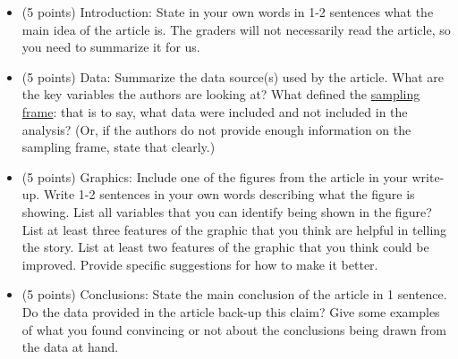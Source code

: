 \documentclass{article}\usepackage[]{graphicx}\usepackage[]{color}
\begin{document}
\begin{itemize}
    \item (5 points) Introduction: State in your own words in 1-2 sentences what the main idea of the article is. The graders will not necessarily read the article, so you need to summarize it for us.
    \item (5 points) Data: Summarize the data source(s) used by the article. What are the key variables the authors are looking at? What defined the \href{https://en.wikipedia.org/wiki/Sampling_frame}{sampling frame}: that is to say, what data were included and not included in the analysis? (Or, if the authors do not provide enough information on the sampling frame, state that clearly.) 
    \item (5 points) Graphics: Include one of the figures from the article in your write-up. Write 1-2 sentences in your own words describing what the figure is showing. List all variables that you can identify being shown in the figure? List at least three features of the graphic that you think are helpful in telling the story. List at least two features of the graphic that you think could be improved. Provide specific suggestions for how to make it better.
    \item (5 points) Conclusions: State the main conclusion of the article in 1 sentence. Do the data provided in the article back-up this claim? Give some examples of what you found convincing or not about the conclusions being drawn from the data at hand.
\end{itemize}
\end{document}
